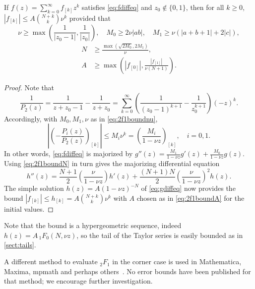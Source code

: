 \documentclass[review,nohypdvips]{siamart0216}
\begin{document}
\begin{theorem}
If $f(z) = \sum_{k=0}^{\infty} f_{[k]} z^k$ satisfies \cref{eq:fdiffeq} and $z_0 \not \in \{0,1\}$, then
for all $k \ge 0$,
$|f_{[k]}| \le A \binom{N+k}{k} \nu^k$
provided that
\begin{equation}
\label{eq:2f1boundnu} \nu \ge \max\left(\frac{1}{|z_0-1|}, \frac{1}{|z_0|}\right), \quad M_0 \ge 2 \nu |ab|, \quad M_1 \ge \nu (|a+b+1| + 2|c|),
\end{equation}
\begin{align}
\label{eq:2f1boundN} N &\ge \frac{\max(\sqrt{2 M_0}, 2 M_1)}{\nu}, \\
\label{eq:2f1boundA} A &\ge \max\left(|f_{[0]}|, \frac{|f_{[1]}|}{\nu (N+1)}\right).
\end{align}
\end{theorem}

\begin{proof}
Note that
\begin{equation*}
\frac{1}{P_2(z)} = \frac{1}{z+z_0-1} - \frac{1}{z+z_0} =
\sum_{k=0}^{\infty} \left(\frac{1}{(z_0-1)^{k+1}} - \frac{1}{z_0^{k+1}}\right) (-z)^k.
\end{equation*}
Accordingly, with $M_0, M_1, \nu$ as in \cref{eq:2f1boundnu},
\begin{equation*}
\left|\left(-\frac{P_i(z)}{P_2(z)}\right)_{[k]}\right| \le M_i \nu^k = \left(\frac{M_i}{1-\nu z}\right)_{[k]},
\quad i = 0,1.
\end{equation*}
In other words, \cref{eq:fdiffeq} is majorized by
$g''(z) = \frac{M_1}{1-\nu z} g'(z) + \frac{M_0}{1-\nu z} g(z).$
Using \cref{eq:2f1boundN} in turn gives the majorizing differential equation
\begin{equation}
h''(z) = \frac{N+1}{2} \left( \frac{\nu}{1-\nu z} \right) h'(z)
+ \frac{(N+1)N}{2} \left( \frac{\nu}{1-\nu z} \right)^2 h(z).
\label{eq:gdiffeq}
\end{equation}
The simple solution $h(z) = A (1-\nu z)^{-N}$
of \cref{eq:gdiffeq} now provides the bound
$|f_{[k]}| \le h_{[k]} = A \binom{N+k}{k} \nu^k$
with $A$ chosen as in \cref{eq:2f1boundA} for the initial values.
\end{proof}

Note that the bound
is a hypergeometric sequence, indeed $h(z) = A \, {}_1F_0(N,\nu z)$,
so the tail of the Taylor series
is easily bounded as in \cref{sect:tails}.

A different method to evaluate ${}_2F_1$ in the corner case
is used in Mathematica, Maxima, mpmath and perhaps
others~\cite{maxgosp,vogtgosp}. No error bounds have been published
for that method; we encourage further investigation.
\end{document}
